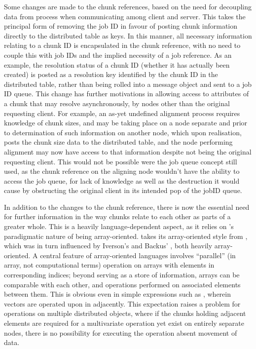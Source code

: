 Some changes are made to the chunk references, based on the need for decoupling data from process when communicating among client and server.
This takes the principal form of removing the job ID in favour of posting chunk information directly to the distributed table as keys.
In this manner, all necessary information relating to a chunk ID is encapsulated in the chunk reference, with no need to couple this with job IDs and the implied necessity of a job reference.
As an example, the resolution status of a chunk ID (whether it has actually been created) is posted as a resolution key identified by the chunk ID in the distributed table, rather than being rolled into a message object and sent to a job ID queue.
This change has further motivations in allowing access to attributes of a chunk that may resolve asynchronously, by nodes other than the original requesting client.
For example, an as-yet undefined alignment process requires knowledge of chunk sizes, and may be taking place on a node separate and prior to determination of such information on another node, which upon realisation, posts the chunk size data to the distributed table, and the node performing alignment may now have access to that information despite not being the original requesting client.
This would not be possible were the job queue concept still used, as the chunk reference on the aligning node wouldn't have the ability to access the job queue, for lack of knowledge as well as the destruction it would cause by obstructing the original client in its intended pop of the jobID queue.

In addition to the changes to the chunk reference, there is now the essential need for further information in the way chunks relate to each other as parts of a greater whole.
This is a heavily language-dependent aspect, as it relies on \R{}'s paradigmatic nature of being array-oriented.
\R{} takes its array-oriented style from , which was in turn influenced by
Iverson's  and Backus' , both heavily
array-oriented\cites{becker1994shistory,iverson2007notation}.
A central feature of array-oriented languages involves ``parallel'' (in array, not computational terms) operation on arrays with elements in corresponding indices; beyond serving as a store of information, arrays can be comparable with each other, and operations performed on associated elements between them.
This is obvious even in simple expressions such as , wherein vectors are operated upon in adjacently.
This expectation raises a problem for operations on multiple distributed objects, where if the chunks holding adjacent elements are required for a multivariate operation yet exist on entirely separate nodes, there is no possibility for executing the operation absent movement of data.

